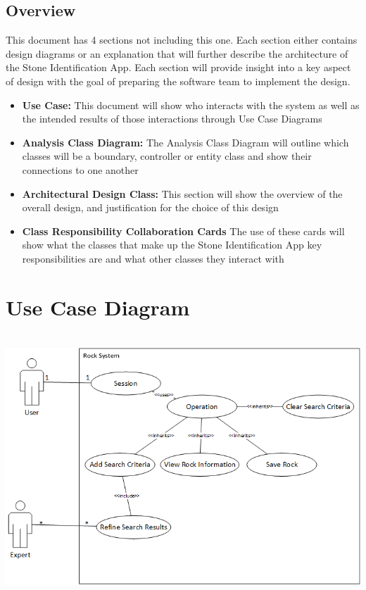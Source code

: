 \documentclass[titlepage]{article}
\begin{document}
\subsection{Overview}
This document has 4 sections not including this one. Each section either contains design diagrams or an explanation that will further describe the architecture of the Stone Identification App. Each section will provide insight into a key aspect of design with the goal of preparing the software team to implement the design.
\begin{itemize}
	\item \textbf{Use Case:} This document will show who interacts with the system as well as the intended results of those interactions through Use Case Diagrams
	\item \textbf{Analysis Class Diagram:} The Analysis Class Diagram will outline which classes will be a boundary, controller or entity class and show their connections to one another
	\item \textbf{Architectural Design Class:} This section will show the overview of the overall design, and justification for the choice of this design
	\item \textbf{Class Responsibility Collaboration Cards} The use of these cards will show what the classes that make up the Stone Identification App key responsibilities are and what other classes they interact with
\end{itemize}


\newpage
\section{Use Case Diagram}~\\

  \includegraphics[scale = 0.5]{../resources/UseCaseDiagram.png}
\end{document}
